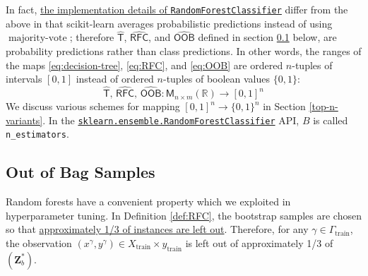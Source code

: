 \documentclass[11pt]{article}
\theoremstyle{definition}
\numberwithin{equation}{section}
\begin{document}
In fact,
\href{https://scikit-learn.org/stable/modules/ensemble.html\#random-forests}{the
  implementation details of \texttt{RandomForestClassifier}} differ from
the above in that scikit-learn averages probabilistic predictions
instead of using \(\operatorname{majority-vote}\); therefore
\(\hat{\mathsf{T}} \), \(\operatorname{\widehat{\mathsf{RFC}}}\), and \(\operatorname{\widehat{\mathsf{OOB}}}\)
defined in section \ref{out-of-bag-samples} below, are probability predictions
rather than class predictions.
In other words, the ranges of the maps \eqref{eq:decision-tree}, \eqref{eq:RFC}, and \eqref{eq:OOB}
are ordered $n$-tuples of intervals $[0,1]$ instead of ordered $n$-tuples of boolean values $\{0,1\}$:
\begin{equation}\label{eq:tree-ranges}
\hat{\mathsf{T}},\, \operatorname{\widehat{\mathsf{RFC}}},\, \operatorname{\widehat{\mathsf{OOB}}} :
\mathsf{M}_{n \times m} (\mathbb{R})  \rightarrow [0, 1]^n
\end{equation}
We discuss various schemes for mapping $[0,1]^n \rightarrow \{0,1\}^n$ in Section \ref{top-n-variants}.
In the
\href{https://scikit-learn.org/stable/modules/generated/sklearn.ensemble.RandomForestClassifier.html\#sklearn.ensemble.RandomForestClassifier}{\texttt{sklearn.ensemble.RandomForestClassifier}}
API, $B$ is called \texttt{n\_estimators}.



\hypertarget{out-of-bag-samples}{%
  \subsection{Out of Bag Samples}\label{out-of-bag-samples}}

Random forests have a convenient property which we exploited in
hyperparameter tuning. In Definition \ref{def:RFC}, the
bootstrap samples are chosen so that \href{https://en.wikipedia.org/wiki/
Bootstrap_aggregating#Description_of_the_technique}
{approximately 1/3 of instances are left out}. Therefore, for any 
\(\gamma \in \Gamma_\text{train}\), the observation
\((x^\gamma, y^\gamma) \in X_\text{train} \times y_\text{train}\) is
left out of approximately 1/3 of \(\left(\mathbf{Z}^*_b\right)\).
\end{document}
